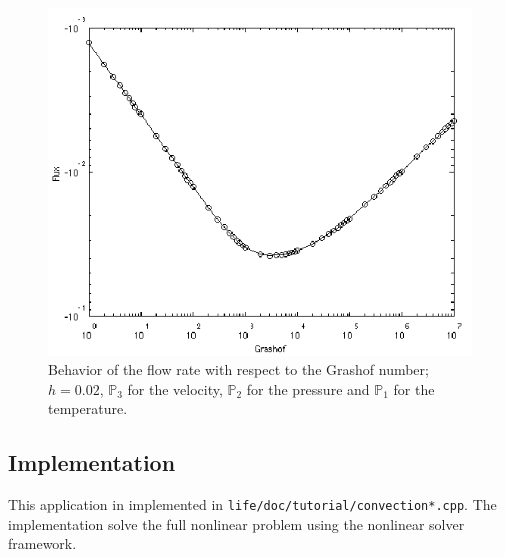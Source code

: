\begin{figure}[htbp]
  \centering
  \includegraphics[width=.8\linewidth]{pngs/debit_grashof}
  \caption{Behavior of the flow rate with respect to the Grashof number; $h = 0.02$,
    $\mathbb{P}_3$ for the velocity, $\mathbb{P}_2$ for the pressure and
    $\mathbb{P}_1$ for the temperature.}
  \label{fig:4}
\end{figure}

\subsection{Implementation}
\label{sec:implementation}

This application in implemented in
\texttt{life/doc/tutorial/convection*.cpp}. The implementation solve
the full nonlinear problem using the nonlinear solver framework.



